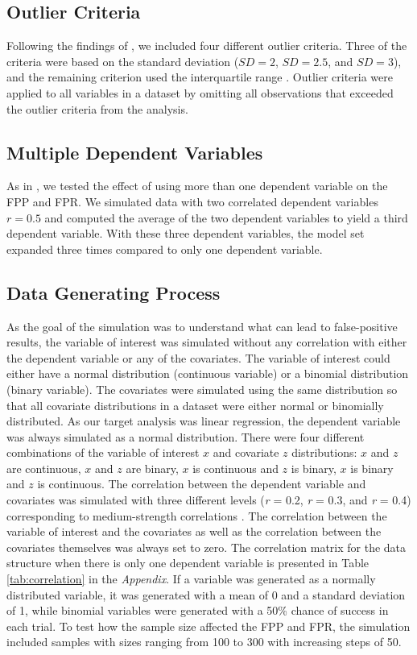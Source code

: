 


\subsection{Outlier Criteria}
Following the findings of \cite{Leyes2013}, we included four different outlier criteria. Three of the criteria were based on the standard deviation ($SD = 2$, $SD = 2.5$, and $SD = 3$), and the remaining criterion used the interquartile range \citep{Rousseeuw2011}. Outlier criteria were applied to all variables in a dataset by omitting all observations that exceeded the outlier criteria from the analysis.

\subsection{Multiple Dependent Variables}
As in \cite{Simmons2011}, we tested the effect of using more than one dependent variable on the FPP and FPR. We simulated data with two correlated dependent variables $r=0.5$ and computed the average of the two dependent variables to yield a third dependent variable. With these three dependent variables, the model set expanded three times compared to only one dependent variable. 

\subsection{Data Generating Process}
As the goal of the simulation was to understand what can lead to false-positive results, the variable of interest was simulated without any correlation with either the dependent variable or any of the covariates. The variable of interest could either have a normal distribution (continuous variable) or a binomial distribution (binary variable). The covariates were simulated using the same distribution so that all covariate distributions in a dataset were either normal or binomially distributed. As our target analysis was linear regression, the dependent variable was always simulated as a normal distribution. There were four different combinations of the variable of interest $x$ and covariate $z$ distributions: $x$ and $z$ are continuous, $x$ and $z$ are binary, $x$ is continuous and $z$ is binary, $x$ is binary and $z$ is continuous. The correlation between the dependent variable and covariates was simulated with three different levels (\textit{r} = 0.2, \textit{r} = 0.3, and \textit{r} = 0.4) corresponding to medium-strength correlations \citep{Cohen1989}. The correlation between the variable of interest and the covariates as well as the correlation between the covariates themselves was always set to zero. The correlation matrix for the data structure when there is only one dependent variable is presented in Table \ref{tab:correlation} in the \textit{Appendix}. If a variable was generated as a normally distributed variable, it was generated with a mean of 0 and a standard deviation of 1, while binomial variables were generated with a 50\% chance of success in each trial. To test how the sample size affected the FPP and FPR, the simulation included samples with sizes ranging from 100 to 300 with increasing steps of 50. 

